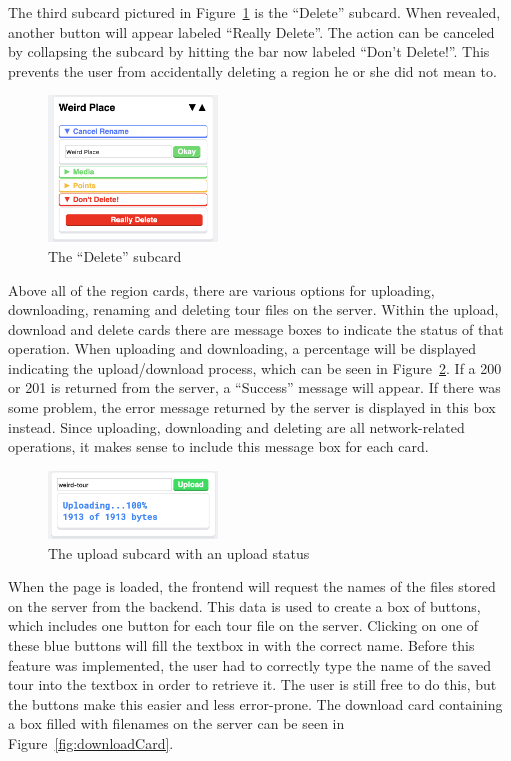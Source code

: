 \documentclass[a4paper, 10pt, american, titlepage]{article}
\begin{document}
The third subcard pictured in Figure~\ref{fig:deleteSubcard} is the ``Delete''
subcard. When revealed, another button will appear labeled ``Really Delete''.
The action can be canceled by collapsing the subcard by hitting the bar now
labeled ``Don't Delete!''. This prevents the user from accidentally deleting a
region he or she did not mean to.

\begin{figure}[h]
	\centering
    \includegraphics[width=0.4\textwidth]{delete-subcard-editour.png}
    \caption{The ``Delete'' subcard}
	\label{fig:deleteSubcard}
\end{figure}

Above all of the region cards, there are various options for uploading,
downloading, renaming and deleting tour files on the server. Within the upload,
download and delete cards there are message boxes to indicate the status of
that operation. When uploading and downloading, a percentage will be displayed
indicating the upload/download process, which can be seen in
Figure~\ref{fig:uploadingMessage}. If a 200 or 201 is returned from the server,
a ``Success'' message will appear. If there was some problem, the error message
returned by the server is displayed in this box instead. Since uploading,
downloading and deleting are all network-related operations, it makes sense to
include this message box for each card.

\begin{figure}[h]
	\centering
    \includegraphics[width=0.4\textwidth]{uploading-message-editour.png}
    \caption{The upload subcard with an upload status}
	\label{fig:uploadingMessage}
\end{figure}

When the page is loaded, the frontend will request the names of the files
stored on the server from the backend. This data is used to create a box of
buttons, which includes one button for each tour file on the server. Clicking
on one of these blue buttons will fill the textbox in with the correct name.
Before this feature was implemented, the user had to correctly type the name of
the saved tour into the textbox in order to retrieve it. The user is still free
to do this, but the buttons make this easier and less error-prone. The download
card containing a box filled with filenames on the server can be seen in
Figure~\ref{fig:downloadCard}.
\end{document}
